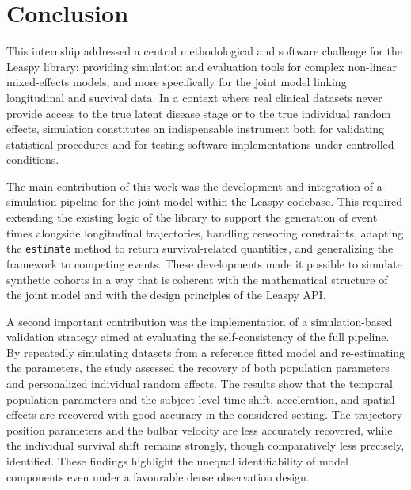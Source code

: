 \documentclass{rapportCS}
\begin{document}
\newpage


\section{Conclusion}

This internship addressed a central methodological and software challenge for the Leaspy library: providing simulation and evaluation tools for complex non-linear mixed-effects models, and more specifically for the joint model linking longitudinal and survival data. In a context where real clinical datasets never provide access to the true latent disease stage or to the true individual random effects, simulation constitutes an indispensable instrument both for validating statistical procedures and for testing software implementations under controlled conditions.

The main contribution of this work was the development and integration of a simulation pipeline for the joint model within the Leaspy codebase. This required extending the existing logic of the library to support the generation of event times alongside longitudinal trajectories, handling censoring constraints, adapting the \texttt{estimate} method to return survival-related quantities, and generalizing the framework to competing events. These developments made it possible to simulate synthetic cohorts in a way that is coherent with the mathematical structure of the joint model and with the design principles of the Leaspy API.

A second important contribution was the implementation of a simulation-based validation strategy aimed at evaluating the self-consistency of the full pipeline. By repeatedly simulating datasets from a reference fitted model and re-estimating the parameters, the study assessed the recovery of both population parameters and personalized individual random effects. The results show that the temporal population parameters and the subject-level time-shift, acceleration, and spatial effects are recovered with good accuracy in the considered setting. The trajectory position parameters and the bulbar velocity are less accurately recovered, while the individual survival shift remains strongly, though comparatively less precisely, identified. These findings highlight the unequal identifiability of model components even under a favourable dense observation design.
\end{document}
